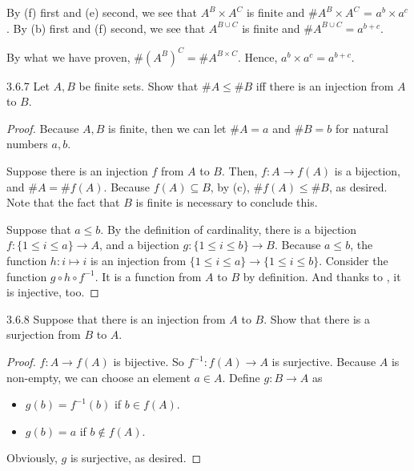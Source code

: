 By  (f) first and (e) second, we see that $A^B \times A^C$ is finite and $\#A^B \times A^C$ = $a^b \times a^c$.
By  (b) first and (f) second, we see that $A^{B \cup C}$ is finite and $\#A^{B \cup C} = a^{b + c}$. 

By what we have proven, $\#(A^B)^C = \#A^{B \times C}$. Hence, $a^b \times a^c = a^{b + c}$.

\begin{exercise}{3.6.7}
	Let $A,B$ be finite sets. Show that $\#A \le \#B$ iff there is an injection from $A$ to $B$.
\end{exercise}
\begin{proof}
Because $A,B$ is finite, then we can let $\#A = a$ and $\#B = b$ for natural numbers $a,b$.

\myifbox Suppose there is an injection $f$ from $A$ to $B$. Then, $f: A \to f(A)$ is a bijection, and $\#A = \#f(A)$. Because $f(A) \subseteq B$, by  (c), $\#f(A) \le \#B$, as desired. Note that the fact that $B$ is finite is necessary to conclude this.

\myoifbox Suppose that $a \le b$. By the definition of cardinality, there is a bijection $f: \{1 \le i \le a\} \to A$, and a bijection $g: \{1 \le i \le b\} \to B$. Because $a \le b$, the function $h: i \mapsto i$ is an injection from $\{1 \le i \le a\} \to \{1 \le i \le b\}$. Consider the function $g \circ h \circ f^{-1}$. It is a function from $A$ to $B$ by definition. And thanks to , it is injective, too.
\end{proof}

\begin{exercise}{3.6.8}
	Suppose that there is an injection from $A$ to $B$. Show that there is a surjection from $B$ to $A$.
\end{exercise}
\begin{proof}
$f:A \rightarrow f(A)$ is bijective. So $f^{-1}: f(A) \rightarrow A$ is surjective. Because $A$ is non-empty, we can choose an element $a \in A$. Define $g: B \to A$ as 
\begin{itemize}
\item $g(b) = f^{-1}(b)$ if $b \in f(A)$.
\item $g(b) = a$ if $b \notin f(A)$.
\end{itemize}

Obviously, $g$ is surjective, as desired.
\end{proof}

